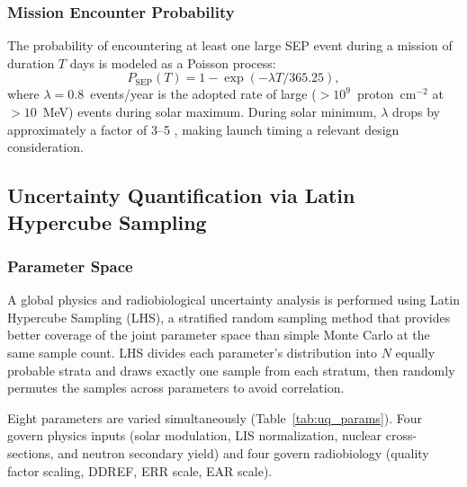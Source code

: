 \subsubsection{Mission Encounter Probability}
\label{sec:seprisk}

The probability of encountering at least one large SEP event during a mission
of duration $T$ days is modeled as a Poisson process:
\begin{equation}
  P_\mathrm{SEP}(T) = 1 - \exp(-\lambda T / 365.25),
  \label{eq:seprisk}
\end{equation}
where $\lambda = 0.8$~events/year is the adopted rate of large
($>10^9$~proton~cm$^{-2}$ at $>10$~MeV) events during solar maximum.
During solar minimum, $\lambda$ drops by approximately a factor of 3--5
\citep{feynman1993}, making launch timing a relevant design consideration.

\subsection{Uncertainty Quantification via Latin Hypercube Sampling}
\label{sec:uq}

\subsubsection{Parameter Space}
\label{sec:params}

A global physics and radiobiological uncertainty analysis is performed using
Latin Hypercube Sampling (LHS), a stratified random sampling method that
provides better coverage of the joint parameter space than simple Monte Carlo
at the same sample count.
LHS divides each parameter's distribution into $N$ equally probable strata
and draws exactly one sample from each stratum, then randomly permutes
the samples across parameters to avoid correlation.

Eight parameters are varied simultaneously (Table~\ref{tab:uq_params}).
Four govern physics inputs (solar modulation, LIS normalization, nuclear
cross-sections, and neutron secondary yield) and four govern radiobiology
(quality factor scaling, DDREF, ERR scale, EAR scale).

